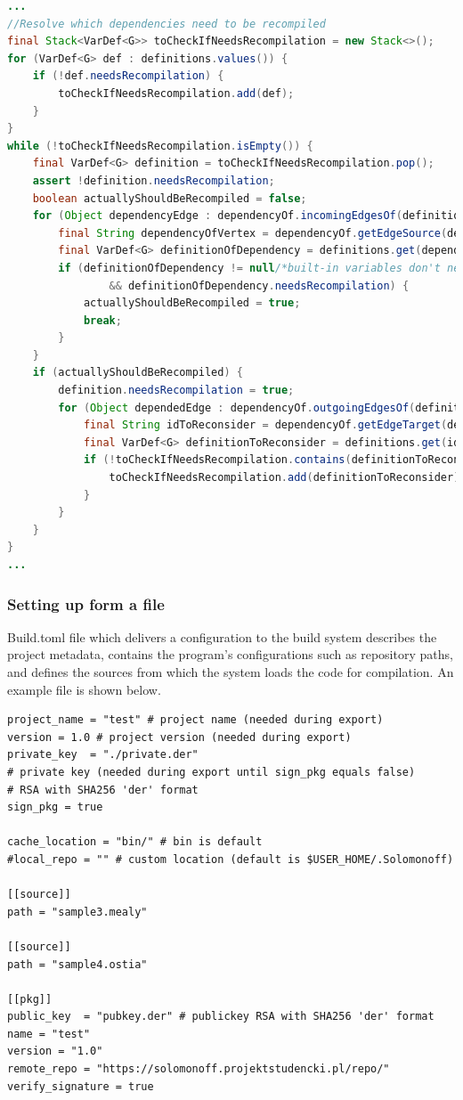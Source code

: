 \begin{lstlisting}[language=Java, frame=single]
...
//Resolve which dependencies need to be recompiled
final Stack<VarDef<G>> toCheckIfNeedsRecompilation = new Stack<>();
for (VarDef<G> def : definitions.values()) {
    if (!def.needsRecompilation) {
        toCheckIfNeedsRecompilation.add(def);
    }
}
while (!toCheckIfNeedsRecompilation.isEmpty()) {
    final VarDef<G> definition = toCheckIfNeedsRecompilation.pop();
    assert !definition.needsRecompilation;
    boolean actuallyShouldBeRecompiled = false;
    for (Object dependencyEdge : dependencyOf.incomingEdgesOf(definition.id)) {
        final String dependencyOfVertex = dependencyOf.getEdgeSource(dependencyEdge);
        final VarDef<G> definitionOfDependency = definitions.get(dependencyOfVertex);
        if (definitionOfDependency != null/*built-in variables don't need to recompiled*/
                && definitionOfDependency.needsRecompilation) {
            actuallyShouldBeRecompiled = true;
            break;
        }
    }
    if (actuallyShouldBeRecompiled) {
        definition.needsRecompilation = true;
        for (Object dependedEdge : dependencyOf.outgoingEdgesOf(definition.id)) {
            final String idToReconsider = dependencyOf.getEdgeTarget(dependedEdge);
            final VarDef<G> definitionToReconsider = definitions.get(idToReconsider);
            if (!toCheckIfNeedsRecompilation.contains(definitionToReconsider)) {
                toCheckIfNeedsRecompilation.add(definitionToReconsider);
            }
        }
    }
}
...
\end{lstlisting}

\hypertarget{setting-up-form-a-file}{%
\subsubsection{Setting up form a file}\label{setting-up-form-a-file}}

Build.toml file which delivers a configuration to the build system
describes the project metadata, contains the program's configurations
such as repository paths, and defines the sources from which the system
loads the code for compilation. An example file is shown below.

\begin{verbatim}
project_name = "test" # project name (needed during export)
version = 1.0 # project version (needed during export)
private_key  = "./private.der" 
# private key (needed during export until sign_pkg equals false) 
# RSA with SHA256 'der' format
sign_pkg = true

cache_location = "bin/" # bin is default 
#local_repo = "" # custom location (default is $USER_HOME/.Solomonoff)

[[source]]
path = "sample3.mealy"

[[source]]
path = "sample4.ostia"

[[pkg]]
public_key  = "pubkey.der" # publickey RSA with SHA256 'der' format
name = "test" 
version = "1.0"
remote_repo = "https://solomonoff.projektstudencki.pl/repo/"
verify_signature = true
\end{verbatim}

